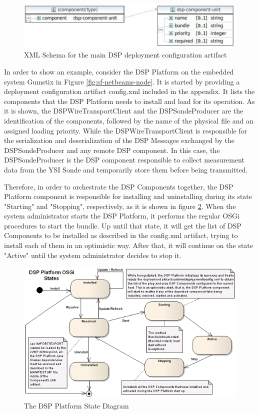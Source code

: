\begin{figure}[h]
  \centering
  \includegraphics[scale=0.8]{../diagrams/config-schema}
  \caption{XML Schema for the main DSP deployment configuration artifact}
  \label{fig:dsp-config-schema}
\end{figure}

In order to show an example, consider the DSP Platform on the embedded system
Gumstix in Figure \ref{fig:sf-netbeams-node}. It is started by providing a
deployment configuration artifact config.xml included in the appendix. It lists
the components that the DSP Platform needs to install and load for its
operation. As it is shown, the DSPWireTransportClient and the DSPSondeProducer
are the identification of the components, followed by the name of the physical
file and an assigned loading priority. While the DSPWireTransportClient is
responsible for the serialization and deserialization of the DSP Messages
exchanged by the DSPSondeProducer and any remote DSP component. In this case,
the DSPSondeProducer is the DSP component responsible to collect measurement
data from the YSI Sonde and temporarily store them before being transmitted.

Therefore, in order to orchestrate the DSP Components together, the DSP
Platform component is responsible for installing and uninstalling during its
state "Starting" and "Stopping", respectively, as it is shown in figure
\ref{fig:DSPPlatform-Install-Usage-State-Diagram}. When the system
administrator starts the DSP Platform, it performs the regular OSGi procedures
to start the bundle. Up until that state, it will get the list of DSP
Components to be installed as described in the config.xml artifact, trying to
install each of them in an optimistic way. After that, it will continue on the
state "Active" until the system administrator decides to stop it.

\begin{figure}[!b]
  \centering
  \includegraphics[scale=0.6]{../diagrams/DSPPlatform-Install-Usage-State-Diagram}
  \caption{The DSP Platform State Diagram}
  \label{fig:DSPPlatform-Install-Usage-State-Diagram}
\end{figure}

